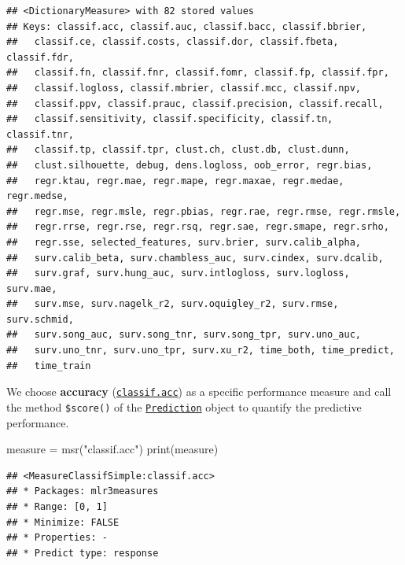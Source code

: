 \documentclass[
]{scrbook}
\newenvironment{Shaded}{\begin{snugshade}}{\end{snugshade}}
\newcommand{\FunctionTok}[1]{\textcolor[rgb]{0.00,0.00,0.00}{#1}}
\newcommand{\NormalTok}[1]{#1}
\newcommand{\OtherTok}[1]{\textcolor[rgb]{0.56,0.35,0.01}{#1}}
\newcommand{\SpecialCharTok}[1]{\textcolor[rgb]{0.00,0.00,0.00}{#1}}
\newcommand{\StringTok}[1]{\textcolor[rgb]{0.31,0.60,0.02}{#1}}
\renewenvironment{Shaded} {\begin{snugshade}\small} {\end{snugshade}}
\begin{document}
\begin{verbatim}
## <DictionaryMeasure> with 82 stored values
## Keys: classif.acc, classif.auc, classif.bacc, classif.bbrier,
##   classif.ce, classif.costs, classif.dor, classif.fbeta, classif.fdr,
##   classif.fn, classif.fnr, classif.fomr, classif.fp, classif.fpr,
##   classif.logloss, classif.mbrier, classif.mcc, classif.npv,
##   classif.ppv, classif.prauc, classif.precision, classif.recall,
##   classif.sensitivity, classif.specificity, classif.tn, classif.tnr,
##   classif.tp, classif.tpr, clust.ch, clust.db, clust.dunn,
##   clust.silhouette, debug, dens.logloss, oob_error, regr.bias,
##   regr.ktau, regr.mae, regr.mape, regr.maxae, regr.medae, regr.medse,
##   regr.mse, regr.msle, regr.pbias, regr.rae, regr.rmse, regr.rmsle,
##   regr.rrse, regr.rse, regr.rsq, regr.sae, regr.smape, regr.srho,
##   regr.sse, selected_features, surv.brier, surv.calib_alpha,
##   surv.calib_beta, surv.chambless_auc, surv.cindex, surv.dcalib,
##   surv.graf, surv.hung_auc, surv.intlogloss, surv.logloss, surv.mae,
##   surv.mse, surv.nagelk_r2, surv.oquigley_r2, surv.rmse, surv.schmid,
##   surv.song_auc, surv.song_tnr, surv.song_tpr, surv.uno_auc,
##   surv.uno_tnr, surv.uno_tpr, surv.xu_r2, time_both, time_predict,
##   time_train
\end{verbatim}

We choose \textbf{accuracy} (\href{https://mlr3.mlr-org.com/reference/mlr_measures_classif.acc.html}{\texttt{classif.acc}}) as a specific performance measure and call the method \texttt{\$score()} of the \href{https://mlr3.mlr-org.com/reference/Prediction.html}{\texttt{Prediction}} object to quantify the predictive performance.

\begin{Shaded}
\begin{Highlighting}[]
\NormalTok{measure }\OtherTok{=} \FunctionTok{msr}\NormalTok{(}\StringTok{"classif.acc"}\NormalTok{)}
\FunctionTok{print}\NormalTok{(measure)}
\end{Highlighting}
\end{Shaded}

\begin{verbatim}
## <MeasureClassifSimple:classif.acc>
## * Packages: mlr3measures
## * Range: [0, 1]
## * Minimize: FALSE
## * Properties: -
## * Predict type: response
\end{verbatim}

\begin{Shaded}
\end{Shaded}
\end{document}
